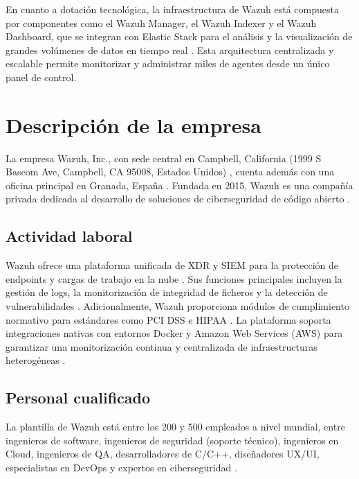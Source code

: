 En cuanto a dotación tecnológica, la infraestructura de Wazuh está compuesta por componentes como el Wazuh Manager, el Wazuh Indexer y el Wazuh Dashboard, que se integran con Elastic Stack para el análisis y la visualización de grandes volúmenes de datos en tiempo real \cite{wazuh_documentation}. Esta arquitectura centralizada y escalable permite monitorizar y administrar miles de agentes desde un único panel de control.

\chapter{Descripción de la empresa}

La empresa Wazuh, Inc., con sede central en Campbell, California (1999 S Bascom Ave, Campbell, CA 95008, Estados Unidos) \cite{linkedin_wazuh}\cite{slideshare_wazuh_bassett}, cuenta además con una oficina principal en Granada, España \cite{glassdoor_wazuh_granada}. Fundada en 2015, Wazuh es una compañía privada dedicada al desarrollo de soluciones de ciberseguridad de código abierto \cite{wazuh_about_us}.

\section{Actividad laboral}
Wazuh ofrece una plataforma unificada de XDR y SIEM para la protección de endpoints y cargas de trabajo en la nube \cite{wazuh_homepage}. Sus funciones principales incluyen la gestión de logs, la monitorización de integridad de ficheros y la detección de vulnerabilidades \cite{wazuh_homepage}\cite{wazuh_about_us}. Adicionalmente, Wazuh proporciona módulos de cumplimiento normativo para estándares como PCI DSS e HIPAA \cite{wazuh_regulatory_compliance}. La plataforma soporta integraciones nativas con entornos Docker y Amazon Web Services (AWS) para garantizar una monitorización continua y centralizada de infraestructuras heterogéneas \cite{wazuh_agent_installation}.

\section{Personal cualificado}
La plantilla de Wazuh está entre los 200 y 500 empleados a nivel mundial, entre ingenieros de software, ingenieros de seguridad (soporte técnico), ingenieros en Cloud, ingenieros de QA, desarrolladores de C/C++, diseñadores UX/UI, especialistas en DevOps y expertos en ciberseguridad \cite{linkedin_wazuh}\cite{wazuh_wikipedia_es}.


